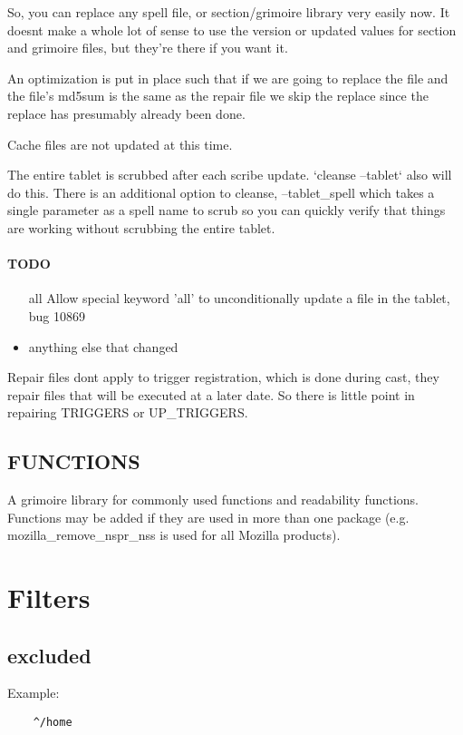 \documentclass[a4paper,10pt]{book}
\begin{document}
So, you can replace any spell file, or section/grimoire library very easily
now. It doesnt make a whole lot of sense to use the version or updated values
for section and grimoire files, but they're there if you want it.

An optimization is put in place such that if we are going to replace the file
and the file's md5sum is the same as the repair file we skip the replace since
the replace has presumably already been done.

Cache files are not updated at this time.

The entire tablet is scrubbed after each scribe update. `cleanse --tablet` also
will do this. There is an additional option to cleanse, --tablet\_spell which
takes a single parameter as a spell name to scrub so you can quickly verify
that things are working without scrubbing the entire tablet.

\subsubsection{TODO}
\begin{itemize}
\item[all]
Allow special keyword 'all' to unconditionally update a file in the tablet, bug
10869
\item anything else that changed
\end{itemize}

Repair files dont apply to trigger registration, which is done during cast,
they repair files that will be executed at a later date. So there is little
point in repairing TRIGGERS or UP\_TRIGGERS.

\section{FUNCTIONS}
A grimoire library for commonly used functions and readability functions.
Functions may be added if they are used in more than one package (e.g.
mozilla\_remove\_nspr\_nss is used for all Mozilla products).

\chapter{Filters}
\section{excluded}

Example:
\begin{verbatim}
	^/home
\end{verbatim}
\end{document}
